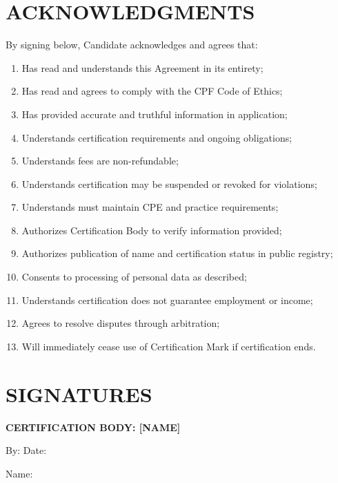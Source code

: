 \documentclass[11pt,a4paper]{article}
\begin{document}
\section{ACKNOWLEDGMENTS}

By signing below, Candidate acknowledges and agrees that:

\begin{enumerate}[label=\alph*)]
\item Has read and understands this Agreement in its entirety;
\item Has read and agrees to comply with the CPF Code of Ethics;
\item Has provided accurate and truthful information in application;
\item Understands certification requirements and ongoing obligations;
\item Understands fees are non-refundable;
\item Understands certification may be suspended or revoked for violations;
\item Understands must maintain CPE and practice requirements;
\item Authorizes Certification Body to verify information provided;
\item Authorizes publication of name and certification status in public registry;
\item Consents to processing of personal data as described;
\item Understands certification does not guarantee employment or income;
\item Agrees to resolve disputes through arbitration;
\item Will immediately cease use of Certification Mark if certification ends.
\end{enumerate}

\vspace{2em}

\section*{SIGNATURES}

\textbf{CERTIFICATION BODY: [NAME]}

\vspace{1.5em}

By: \underline{\hspace{6cm}} Date: \underline{\hspace{3cm}}

Name: \underline{\hspace{6cm}}
\end{document}
